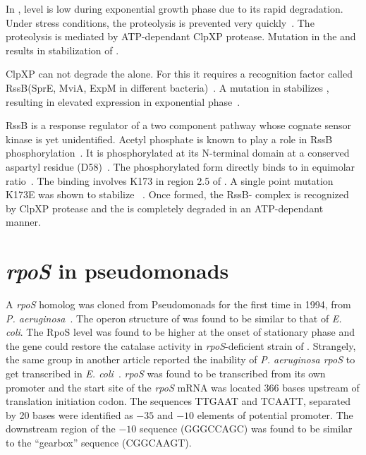 In , \sigs{} level is low during exponential growth phase
due to its rapid degradation. Under stress conditions, the
proteolysis is prevented very quickly~\citep{Lange1994}. The
proteolysis is mediated by ATP-dependant ClpXP protease. Mutation
in the  and  results in stabilization of \sigs{}
\citep{Schweder1996}.

ClpXP can not degrade the \sigs{} alone. For this it requires a
recognition factor called RssB(SprE, MviA, ExpM in different
bacteria)~\citep{Muffler1996c,Hengge2002}. A mutation in 
stabilizes \sigs{}, resulting in elevated expression in
exponential phase~\citep{Muffler1996c}.

RssB is a response regulator of a two component pathway whose
cognate sensor kinase is yet unidentified. Acetyl phosphate is
known to play a role in RssB phosphorylation~\citep{Bouche1998}.
It is phosphorylated at its N-terminal domain at a conserved
aspartyl residue (D58)~\citep{Becker1999}. The phosphorylated form
directly binds to \sigs{} in equimolar ratio~\citep{Klauck2001}.
The binding involves K173 in region 2.5 of \sigs{}. A single point
mutation K173E was shown to stabilize \sigs{}~\citep{Becker1999}.
Once formed, the RssB-\sigs{} complex is recognized by ClpXP
protease and the \sigs{} is completely degraded in an
ATP-dependant manner.


\section{\emph{rpoS} in pseudomonads}

A \emph{rpoS} homolog was cloned from Pseudomonads for the first
time in 1994, from \emph{P. aeruginosa}~\citep{Tanaka1994}. The
operon structure of  was found to be similar to that of
\emph{E. coli}. The RpoS level was found to be higher at the onset
of stationary phase and the gene could restore the catalase
activity in \emph{rpoS}-deficient strain of . Strangely,
the same group in another article reported the inability of \emph{
P. aeruginosa rpoS} to get transcribed in \emph{E.
coli}~\citep{Fujita1994}. \emph{rpoS} was found to be transcribed
from its own promoter and the start site of the \emph{rpoS} mRNA
was located 366 bases upstream of translation initiation codon.
The sequences TTGAAT and TCAATT, separated by 20 bases were
identified as $-35$ and $-10$ elements of potential promoter. The
downstream region of the $-10$ sequence (GGGCCAGC) was found to be
similar to the ``gearbox'' sequence (CGGCAAGT).

